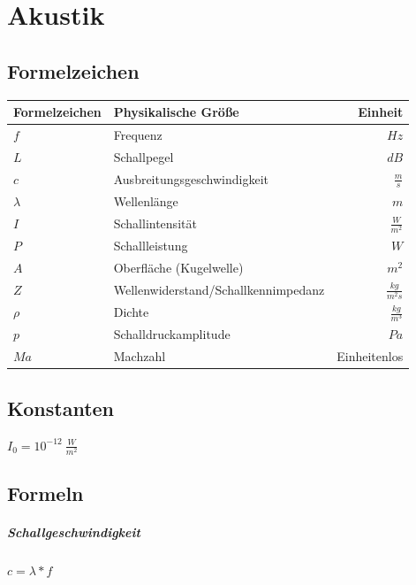 \documentclass[12pt, a4paper]{scrreprt}
\begin{document}
\chapter{Akustik}

\section{Formelzeichen}

\begin{center}
  \makegapedcells{}
  \begin{tabular}{l l r}
    Formelzeichen & Physikalische Größe & Einheit\\
    \hline \hline
    \(f\) & Frequenz & \(Hz\)\\ \hline
    \(L\) & Schallpegel & \(dB\)\\ \hline
    \(c\) & Ausbreitungsgeschwindigkeit & \(\frac{m}{s}\)\\ \hline
    \(\lambda\) & Wellenlänge & \(m\)\\ \hline
    \(I\) & Schallintensität & \(\frac{W}{m^2}\)\\ \hline
    \(P\) & Schallleistung & \(W\)\\ \hline
    \(A\) & Oberfläche (Kugelwelle) & \(m^2\)\\ \hline
    \(Z\) & Wellenwiderstand/Schallkennimpedanz & \(\frac{kg}{m^2s}\)\\ \hline
    \(\rho\) & Dichte & \(\frac{kg}{m^3}\)\\ \hline
    \(p\) & Schalldruckamplitude & \(Pa\)\\ \hline
    \(Ma\) & Machzahl & Einheitenlos\\ \hline
  \end{tabular}
\end{center}

\section{Konstanten}
\(I_0 = 10^{-12}\ \frac{W}{m^2}\)

\section{Formeln}
\paragraph{Schallgeschwindigkeit} \dotfill \(c=\lambda * f\)\\
\end{document}
